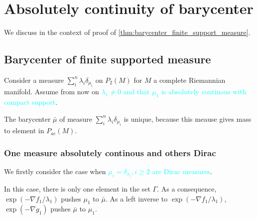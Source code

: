 \section{Absolutely continuity of barycenter}

We discuss in the context of proof of \cref{thm:barycenter_finite_support_measure}.

\subsection{Barycenter of finite supported measure}

Consider a measure $\sum_{i}^{n} \lambda_{i} \delta_{\mu_i}$ on $P_{2}(M)$ for $M$ a complete Riemannian manifold.
Assume from now on \textcolor{cyan}{$ \lambda_1 \neq 0$ and
	that $\mu_1$ is absolutely continous with compact support}.


The barycenter $\bar{\mu}$ of measure $\sum_{i}^{n} \lambda_{i} \delta_{\mu_i}$ is unique,
because this meause gives mass to element in $P_{ac}(M)$.


\subsubsection{One measure absolutely continous and others Dirac}
We firstly consider the case when \textcolor{cyan}{$\mu_i = \delta_{x_i}, i \geq 2$ are Dirac measures}.

In this case, there is only one element in the set $\Gamma$.
As a consequence, $\exp(-\nabla f_1 / \lambda_1)$ pushes $\mu_1$ to $\bar{\mu}$.
As a left inverse to $\exp(-\nabla f_1/\lambda_1)$,
\(\exp(-\nabla g_1)\) pushes $\bar{\mu}$ to $\mu_1$.


